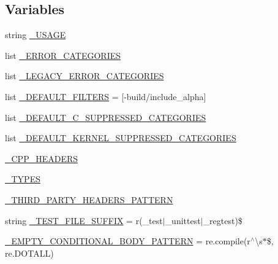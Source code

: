 \subsection*{Variables}
\begin{DoxyCompactItemize}
\item 
string \hyperlink{namespacecpplint_a41b929f9dd8e3b70c0bc50f2e09bff36}{\+\_\+\+U\+S\+A\+GE}
\item 
list \hyperlink{namespacecpplint_a443dd7edd596a47a3973064c86d24474}{\+\_\+\+E\+R\+R\+O\+R\+\_\+\+C\+A\+T\+E\+G\+O\+R\+I\+ES}
\item 
list \hyperlink{namespacecpplint_a57f33bd76a6086498bdad77f4d921fdc}{\+\_\+\+L\+E\+G\+A\+C\+Y\+\_\+\+E\+R\+R\+O\+R\+\_\+\+C\+A\+T\+E\+G\+O\+R\+I\+ES}
\item 
list \hyperlink{namespacecpplint_af698c82fac7cff7d454fd8ca2be35e68}{\+\_\+\+D\+E\+F\+A\+U\+L\+T\+\_\+\+F\+I\+L\+T\+E\+RS} = \mbox{[}\textquotesingle{}-\/build/include\+\_\+alpha\textquotesingle{}\mbox{]}
\item 
list \hyperlink{namespacecpplint_a32c68628f86e9d7c90d1cdb52277dbcc}{\+\_\+\+D\+E\+F\+A\+U\+L\+T\+\_\+\+C\+\_\+\+S\+U\+P\+P\+R\+E\+S\+S\+E\+D\+\_\+\+C\+A\+T\+E\+G\+O\+R\+I\+ES}
\item 
list \hyperlink{namespacecpplint_aa91fc7f951bf23aa73c820508ca6ff7d}{\+\_\+\+D\+E\+F\+A\+U\+L\+T\+\_\+\+K\+E\+R\+N\+E\+L\+\_\+\+S\+U\+P\+P\+R\+E\+S\+S\+E\+D\+\_\+\+C\+A\+T\+E\+G\+O\+R\+I\+ES}
\item 
\hyperlink{namespacecpplint_a4854144fb2320157db25efaf2fddcdff}{\+\_\+\+C\+P\+P\+\_\+\+H\+E\+A\+D\+E\+RS}
\item 
\hyperlink{namespacecpplint_afd2511b963c71a6c7281f7f85370c808}{\+\_\+\+T\+Y\+P\+ES}
\item 
\hyperlink{namespacecpplint_abedff37ffb696f5ee67db5d535f29bcd}{\+\_\+\+T\+H\+I\+R\+D\+\_\+\+P\+A\+R\+T\+Y\+\_\+\+H\+E\+A\+D\+E\+R\+S\+\_\+\+P\+A\+T\+T\+E\+RN}
\item 
string \hyperlink{namespacecpplint_ad2dbcaa297b928362b95867fdbf2b278}{\+\_\+\+T\+E\+S\+T\+\_\+\+F\+I\+L\+E\+\_\+\+S\+U\+F\+F\+IX} = r\textquotesingle{}(\+\_\+test$\vert$\+\_\+unittest$\vert$\+\_\+regtest)\$\textquotesingle{}
\item 
\hyperlink{namespacecpplint_a8cd8b98aa00e581d653067079f82c7ab}{\+\_\+\+E\+M\+P\+T\+Y\+\_\+\+C\+O\+N\+D\+I\+T\+I\+O\+N\+A\+L\+\_\+\+B\+O\+D\+Y\+\_\+\+P\+A\+T\+T\+E\+RN} = re.\+compile(r\textquotesingle{}$^\wedge$\textbackslash{}s$\ast$\$\textquotesingle{}, re.\+D\+O\+T\+A\+LL)
\item 

\end{DoxyCompactItemize}
